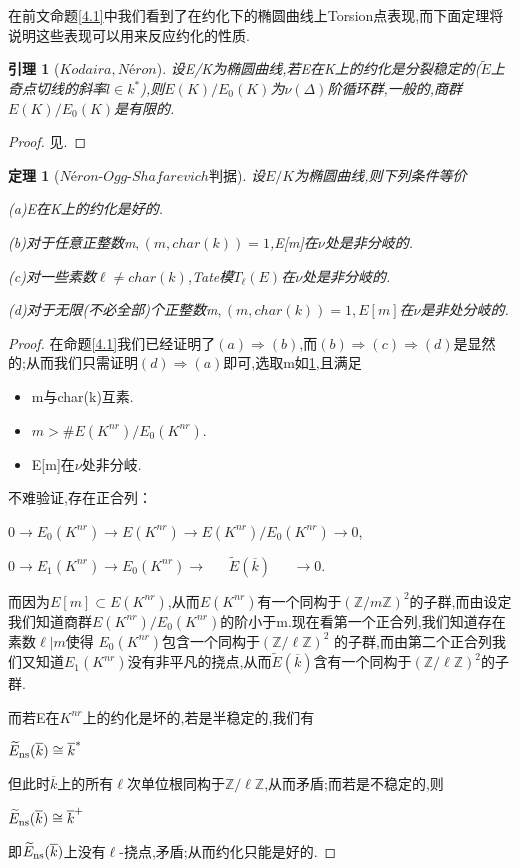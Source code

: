 \documentclass[11pt]{ctexart}
\newtheorem{thm}{定理}[section]
\newtheorem{lem}{引理}[section]
\begin{document}
在前文命题\ref{4.1}中我们看到了在约化下的椭圆曲线上Torsion点表现,而下面定理将说明这些表现可以用来反应约化的性质.
\begin{lem}[$Kodaira,N$é$ron$]设E/K为椭圆曲线,若E在K上的约化是分裂稳定的($\widetilde{E}$上奇点切线的斜率$l\in k^{*}$),则$E(K)/E_0(K)$为$\nu(\Delta)$阶循环群,一般的,商群$E(K)/E_0(K)$是有限的.
    
\end{lem}
\begin{proof}
    见\cite{ATEC}.
\end{proof}
\begin{thm}[$N$é$ron$-$Ogg$-$Shafarevich$判据]\label{4.5}设$E/K$为椭圆曲线,则下列条件等价

    (a)E在K上的约化是好的.

    (b)对于任意正整数m$,(m,char(k))=1$,E[m]在$\nu$处是非分岐的.

    (c)对一些素数$\ell \neq char(k)$,Tate模$T_{\ell}(E)$在$\nu$处是非分岐的.

    (d)对于无限(不必全部)个正整数m$,(m,char(k))=1$$,E[m]$在$\nu$是非处分岐的.
\end{thm}
\begin{proof}在命题\ref{4.1}我们已经证明了$(a)\Longrightarrow (b)$,而$(b)\Longrightarrow(c)\Longrightarrow(d)$是显然的;从而我们只需证明$(d)\Longrightarrow(a)$即可,选取m如\ref{4.5},且满足
\begin{itemize}
    \item m与char(k)互素.
    \item $m>\# E(K^{nr})/E_0(K^{nr})$.
    \item E[m]在$\nu$处非分岐.
\end{itemize}
不难验证,存在正合列：
\begin{center}
    $0\rightarrow E_0(K^{nr})\rightarrow E(K^{nr})\rightarrow E(K^{nr})/E_0(K^{nr})\rightarrow 0$,

    $0\rightarrow E_1(K^{nr})\rightarrow E_0(K^{nr})\rightarrow ~~~~~~~\widetilde{E}(\overline{k})~~~~~~~\rightarrow 0$.
\end{center}
而因为$E[m]\subset E(K^{nr})$,从而$E(K^{nr})$有一个同构于$(\mathbb{Z}/m\mathbb{Z})^2$的子群,而由设定我们知道商群$E(K^{nr})/E_0(K^{nr})$的阶小于m.现在看第一个正合列,我们知道存在素数$\ell | m$使得 $E_0(K^{nr})$包含一个同构于$(\mathbb{Z}/ \ell \mathbb{Z})^2$
的子群,而由第二个正合列我们又知道$ E_1(K^{nr})$没有非平凡的挠点,从而$\widetilde{E}(\overline{k})$含有一个同构于$(\mathbb{Z}/ \ell \mathbb{Z})^2$的子群.

而若E在$K^{nr}$上的约化是坏的,若是半稳定的,我们有
\begin{center}
    $\widetilde{E}_{\textup{ns}}(\overline{k}) \cong \overline{k}^{*}$
\end{center}
但此时$\overline{k}$上的所有$\ell$次单位根同构于$\mathbb{Z}/ \ell \mathbb{Z}$,从而矛盾;而若是不稳定的,则
\begin{center}
    $\widetilde{E}_{\textup{ns}}(\overline{k}) \cong \overline{k}^{+}$
\end{center}
即$\widetilde{E}_{\textup{ns}}(\overline{k})$上没有$\ell$-挠点,矛盾;从而约化只能是好的.
\end{proof}
\end{document}
